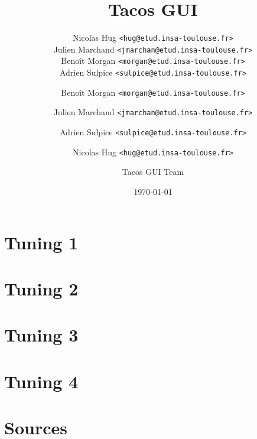 \documentclass[xcolor=table,12pt]{beamer}
\title{Tacos GUI}
\author[Tacos GUI Team]{
\footnotesize
Nicolas Hug \texttt{<hug@etud.insa-toulouse.fr>}\\
Julien Marchand \texttt{<jmarchan@etud.insa-toulouse.fr>}\\
Benoît Morgan \texttt{<morgan@etud.insa-toulouse.fr>}\\
Adrien Sulpice \texttt{<sulpice@etud.insa-toulouse.fr>}\\
\normalsize
}
\institute{INSA de Toulouse}
\date{\today}
\begin{document}

\frame{\titlepage}


\author{Benoît Morgan \texttt{<morgan@etud.insa-toulouse.fr>}}
\section{Tuning 1}
%

\author{Julien Marchand \texttt{<jmarchan@etud.insa-toulouse.fr>}}
\section{Tuning 2}
%

\author{Adrien Sulpice \texttt{<sulpice@etud.insa-toulouse.fr>}}
\section{Tuning 3}
%

\author{Nicolas Hug \texttt{<hug@etud.insa-toulouse.fr>}}
\section{Tuning 4}
%

\author{Tacos GUI Team}
\section{Sources}

\end{document}
